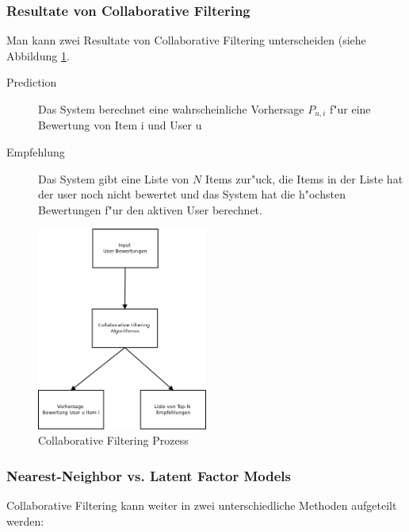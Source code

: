 \documentclass[a4paper, 12pt]{article}
\begin{document}
\subsubsection{Resultate von Collaborative Filtering}
\label{sec:output}

Man kann zwei Resultate von Collaborative Filtering unterscheiden (siehe Abbildung \ref{fig:cfprocess}.

\begin{description}
\item[Prediction] Das System berechnet eine wahrscheinliche Vorhersage $P_{u,i}$ f"ur eine Bewertung von Item i und User u
\item[Empfehlung] Das System gibt eine Liste von $N$ Items zur"uck, die Items in der Liste hat der user noch nicht bewertet und das System hat die h"ochsten Bewertungen f"ur den aktiven User berechnet.
\end{description}

\begin{figure}
  \centering
      \includegraphics[width=0.5\textwidth]{cf}
  \caption{Collaborative Filtering Prozess}
  \label{fig:cfprocess}
\end{figure}

\subsubsection{Nearest-Neighbor vs. Latent Factor Models}
\label{sec:cfmodels}

Collaborative Filtering kann weiter in zwei unterschiedliche Methoden aufgeteilt werden:
\end{document}
